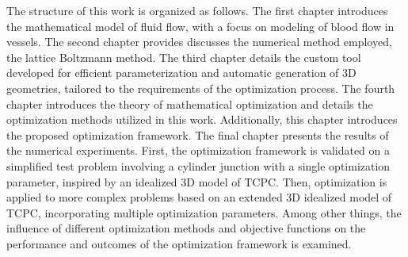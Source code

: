 

The structure of this work is organized as follows. The first chapter introduces the mathematical model of fluid flow, with a focus on modeling of blood flow in vessels. The second chapter provides discusses the numerical method employed, the lattice Boltzmann method. The third chapter details the custom tool developed for efficient parameterization and automatic generation of 3D geometries, tailored to the requirements of the optimization process. The fourth chapter introduces the theory of mathematical optimization and details the optimization methods utilized in this work. Additionally, this chapter introduces the proposed optimization framework. The final chapter presents the results of the numerical experiments. First, the optimization framework is validated on a simplified test problem involving a cylinder junction with a single optimization parameter, inspired by an idealized 3D model of TCPC. Then, optimization is applied to more complex problems based on an extended 3D idealized model of TCPC, incorporating multiple optimization parameters. Among other things, the influence of different optimization methods and objective functions on the performance and outcomes of the optimization framework is examined.


